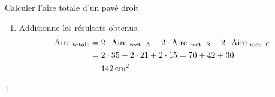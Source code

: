 \documentclass[a4paper,11pt]{report}
\begin{document}
\begin{resolu}{Calculer l'aire totale d'un pavé droit}
{\begin{enumerate}
    $\mathrm{Aire}_{\mathrm{~rectangle~C}}=3\cdot5=15$
    
    \item Additionne les résultats obtenus.
    \begin{align*}
        \mathrm{Aire}_{\mathrm{~totale}}&=2\cdot \mathrm{Aire}_{\mathrm{~rect.~A}} + 2\cdot \mathrm{Aire}_{\mathrm{~rect.~B}} + 2\cdot \mathrm{Aire}_{\mathrm{~rect.~C}}\\
        &= 2\cdot 35 + 2\cdot21 + 2\cdot15=70+42+30\\
        &=\tunit{142}{\centi m^2}   
    \end{align*}
    
\end{enumerate}
}{1}    
\end{resolu}


\end{document}
